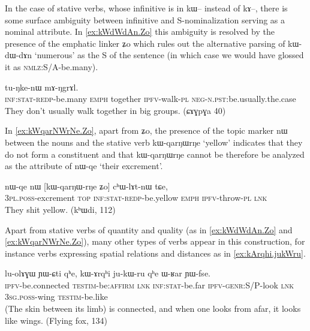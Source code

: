 \documentclass[oldfontcommands,oneside,a4paper,11pt]{article}
\newcommand{\ipa}[1]{{\phon \mbox{#1}}} %
\begin{document}
  In the case of stative verbs, whose infinitive is in \ipa{kɯ--} instead of \ipa{kɤ--}, there is some surface ambiguity between infinitive and S-nominalization serving as a nominal attribute. In \ref{ex:kWdWdAn.Zo}  this ambiguity is resolved by the presence of the emphatic linker \ipa{ʑo} which rules out the alternative parsing of \ipa{kɯ-dɯ-dɤn} `numerous' as the S of the sentence (in which case we would have glossed it as \textsc{nmlz}:S/A-be.many).
  
\begin{exe}
\ex \label{ex:kWdWdAn.Zo}
\gll
[\ipa{kɯ-dɯ-dɤn} 	\ipa{ʑo}] 	\ipa{tɯtɯrca} 	\ipa{tu-ŋke-nɯ} 	\ipa{mɤ-ŋgrɤl.} \\
\textsc{inf:stat-redp}-be.many \textsc{emph} together \textsc{ipfv}-walk-\textsc{pl} \textsc{neg-n.pst}:be.usually.the.case \\
\glt They don't usually walk together in big groups. (ɕɤɣpɣa 40)
\end{exe}

In \ref{ex:kWqarNWrNe.Zo}, apart from \ipa{ʑo}, the presence of the topic marker \ipa{nɯ} between the nouns and the stative verb 	\ipa{kɯ-qarŋɯrŋe} `yellow' indicates that  they do not form a constituent and that 	\ipa{kɯ-qarŋɯrŋe} cannot be therefore be analyzed as the attribute of  \ipa{nɯ-qe} `their excrement'.

\begin{exe}
\ex \label{ex:kWqarNWrNe.Zo}
\gll
\ipa{nɯ-qe} 	\ipa{nɯ} 	[\ipa{kɯ-qarŋɯ-rŋe} 	\ipa{ʑo}] 	\ipa{cʰɯ-lɤt-nɯ} 	\ipa{tɕe,} \\
\textsc{3pl.poss}-excrement \textsc{top} \textsc{inf:stat-redp}-be.yellow \textsc{emph}  \textsc{ipfv}-throw-\textsc{pl} \textsc{lnk} \\
\glt They shit yellow. (kʰɯdi, 112)
\end{exe}


Apart from stative  verbs of quantity and quality   (as in \ref{ex:kWdWdAn.Zo} and \ref{ex:kWqarNWrNe.Zo}), many other types of verbs appear in this construction, for instance verbs expressing spatial relations and distances as in \ref{ex:kArqhi.jukWru}.

\begin{exe}
\ex \label{ex:kArqhi.jukWru}
\gll
\ipa{lu-olɤɣɯ} 	\ipa{ɲɯ-ɕti} 	\ipa{qʰe,} 	\ipa{kɯ-ɤrqʰi} 	\ipa{ju-kɯ-ru} 	\ipa{qʰe} 	\ipa{ɯ-ʁar} 	\ipa{ɲɯ-fse.}\\
\textsc{ipfv}-be.connected \textsc{testim}-be:\textsc{affirm} \textsc{lnk} \textsc{inf:stat}-be.far \textsc{ipfv-genr}:S/P-look \textsc{lnk} \textsc{3sg.poss}-wing \textsc{testim}-be.like\\
\glt (The skin between its limb) is connected, and when one looks from afar, it looks like wings. (Flying fox, 134)
\end{exe}
\end{document}
